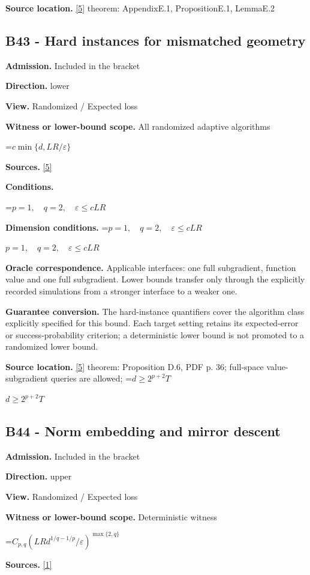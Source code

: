 \documentclass[10pt,a4paper]{article}
\newcommand{\AtlasMath}[1]{\par\begingroup\centering\setbox0=\hbox{$\displaystyle #1$}\ifdim\wd0>1.4\linewidth\typeout{ATLAS WIDE FORMULA: \the\wd0}\fi\ifdim\wd0>\linewidth\resizebox{\linewidth}{!}{\box0}\else\box0\fi\par\endgroup}
\newcommand{\AtlasInlineMath}[1]{\begingroup\setbox0=\hbox{$#1$}\ifdim\wd0>.4\linewidth\endgroup\AtlasMath{#1}\else\endgroup$#1$\fi}
\begin{document}
\textbf{Source location.} \href{https://arxiv.org/pdf/2609.32910}{[5]} theorem: AppendixE.1, PropositionE.1, LemmaE.2

\subsection{B43 - Hard instances for mismatched geometry}
\textbf{Admission.} Included in the bracket

\textbf{Direction.} lower

\textbf{View.} Randomized / Expected loss

\textbf{Witness or lower-bound scope.} All randomized adaptive algorithms

\AtlasMath{c\min\{d,LR/\varepsilon\}}
\textbf{Sources.} \href{https://arxiv.org/pdf/2609.32910}{[5]}

\textbf{Conditions.} 
\AtlasMath{p=1,\quad q=2,\quad\varepsilon\le cLR}


\textbf{Dimension conditions.} \AtlasInlineMath{p=1,\quad q=2,\quad\varepsilon\le cLR}

\textbf{Oracle correspondence.} Applicable interfaces: one full subgradient, function value and one full subgradient. Lower bounds transfer only through the explicitly recorded simulations from a stronger interface to a weaker one.

\textbf{Guarantee conversion.} The hard-instance quantifiers cover the algorithm class explicitly specified for this bound. Each target setting retains its expected-error or success-probability criterion; a deterministic lower bound is not promoted to a randomized lower bound.

\textbf{Source location.} \href{https://arxiv.org/pdf/2609.32910}{[5]} theorem: Proposition D.6, PDF p. 36; full-space value-subgradient queries are allowed; \AtlasInlineMath{d\ge2^{p+2}T}

\subsection{B44 - Norm embedding and mirror descent}
\textbf{Admission.} Included in the bracket

\textbf{Direction.} upper

\textbf{View.} Randomized / Expected loss

\textbf{Witness or lower-bound scope.} Deterministic witness

\AtlasMath{C_{p,q}(LRd^{1/q-1/p}/\varepsilon)^{\max\{2,q\}}}
\textbf{Sources.} \href{https://arxiv.org/pdf/1107.4080}{[1]}
\end{document}
